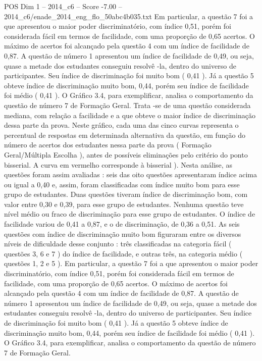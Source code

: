 \begin{textsample}{POS Dim 1 – 2014\_c6 – Score -7.00 – 2014\_c6/enade\_2014\_eng\_flo\_50abc4b035.txt}
Em particular, a questão 7 foi a que apresentou o maior poder discriminatório, com índice 0,51, porém foi considerada fácil em termos de facilidade, com uma proporção de 0,65 acertos.
O máximo de acertos foi alcançado pela questão 4 com um índice de facilidade de 0,87.
A questão de número 1 apresentou um índice de facilidade de 0,49, ou seja, quase a metade dos estudantes conseguiu resolvê -la, dentro do universo de participantes.
Seu índice de discriminação foi muito bom ( 0,41 ).
Já a questão 5 obteve índice de discriminação muito bom, 0,44, porém seu índice de facilidade foi médio ( 0,41 ).
O Gráfico 3.4, para exemplificar, analisa o comportamento da questão de número 7 de Formação Geral.
Trata -se de uma questão considerada mediana, com relação a facilidade e a que obteve o maior índice de discriminação dessa parte da prova.
Neste gráfico, cada uma das cinco curvas representa o percentual de respostas em determinada alternativa da questão, em função do número de acertos dos estudantes nessa parte da prova ( Formação Geral/Múltipla Escolha ), antes de possíveis eliminações pelo critério do ponto bisserial.
A curva em vermelho corresponde à bisserial ).
Nesta análise, as questões foram assim avaliadas : seis das oito questões apresentaram índice acima ou igual a 0,40 e, assim, foram classificadas com índice muito bom para esse grupo de estudantes.
Duas questões tiveram índice de discriminação bom, com valor entre 0,30 e 0,39, para esse grupo de estudantes.
Nenhuma questão teve nível médio ou fraco de discriminação para esse grupo de estudantes.
O índice de facilidade variou de 0,41 a 0,87, e o de discriminação, de 0,36 a 0,51.
As seis questões com índice de discriminação muito bom figuraram entre os diversos níveis de dificuldade desse conjunto : três classificadas na categoria fácil ( questões 3, 6 e 7 ) do índice de facilidade, e outras três, na categoria médio ( questões 1, 2 e 5 ).
Em particular, a questão 7 foi a que apresentou o maior poder discriminatório, com índice 0,51, porém foi considerada fácil em termos de facilidade, com uma proporção de 0,65 acertos.
O máximo de acertos foi alcançado pela questão 4 com um índice de facilidade de 0,87.
A questão de número 1 apresentou um índice de facilidade de 0,49, ou seja, quase a metade dos estudantes conseguiu resolvê -la, dentro do universo de participantes.
Seu índice de discriminação foi muito bom ( 0,41 ).
Já a questão 5 obteve índice de discriminação muito bom, 0,44, porém seu índice de facilidade foi médio ( 0,41 ).
O Gráfico 3.4, para exemplificar, analisa o comportamento da questão de número 7 de Formação Geral.

\end{textsample}
